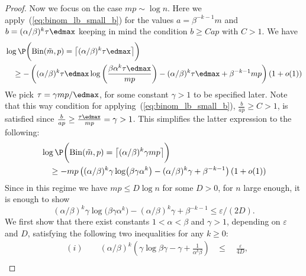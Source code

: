 \begin{proof}
    \noindent
    Now we focus on the case \(mp \sim \log n\). Here we apply~(\ref{eq:binom_lb_small_b}) for the values \(a = {\beta}^{-k-1}m\) and \(b = (\alpha / \beta)^k \tau \edmax\) keeping in mind the condition \(b \geq Cap\) with \(C > 1\). 
    We have
    \begin{equation*}
    \begin{aligned}
         &\log \P\biggl(\mathrm{Bin}(\tilde m, p) = \bigl\lceil (\alpha / \beta)^k \tau \edmax\bigr\rceil \biggr) \\
         &\quad \geq - \left((\alpha / \beta)^k \tau \edmax \log \left(\frac{\beta \alpha^k \tau \edmax}{ mp}\right) - (\alpha / \beta)^k \tau \edmax + \beta^{-k-1}mp\right)(1 + o(1)) %
    \end{aligned}
    \end{equation*}
    We pick \(\tau = \gamma mp / \edmax\), for some constant \(\gamma > 1\) to be specified later. Note that this way condition for applying~(\ref{eq:binom_lb_small_b}), \(\frac{b}{ap} \geq C > 1\), is satisfied since \(\frac{b}{ap} \geq \frac{\tau \edmax}{mp} = \gamma > 1\). This simplifies the latter expression to the following:
       \begin{equation*}
    \begin{aligned}
         &\log \P\biggl(\mathrm{Bin}(\tilde m, p) = \bigl\lceil (\alpha / \beta)^k \gamma mp\bigr\rceil \biggr) \\
         &\quad \geq - mp\left((\alpha / \beta)^k \gamma \log \bigl(\beta \gamma \alpha^k\bigr) - (\alpha / \beta)^k \gamma + \beta^{-k-1}\right)(1 + o(1)) %
    \end{aligned}
    \end{equation*}
Since in this regime we have \(mp \leq D \log n\) for some \(D > 0\), for \(n\) large enough, it is enough to show 
\begin{equation*}
   (\alpha / \beta)^k \gamma \log \bigl(\beta \gamma \alpha^k\bigr) - (\alpha / \beta)^k \gamma + \beta^{-k-1} \leq \varepsilon / (2D).
\end{equation*}
We first show that there exist constants \(1 < \alpha < \beta\) and \(\gamma > 1\), depending on \(\varepsilon\) and \(D\), satisfying the following two inequalities for any \(k \geq 0\):
\begin{equation*}
    \begin{aligned}
        &(i) \qquad (\alpha/\beta)^k \left(\gamma \log \beta \gamma - \gamma + \frac{1}{\alpha^k \beta}\right) &\leq \quad \frac{\varepsilon}{4D}, \\

\end{aligned}
\end{equation*}
\end{proof}
